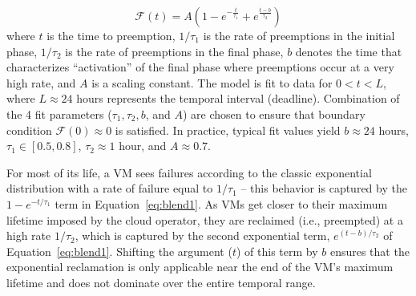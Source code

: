 \vspace*{\subsecspace}
\begin{equation}
  \label{eq:blend1}
  \boxed{
  \mathscr{F}\left(t\right) = A\left(1-e^{-\frac{t}{\tau_1}} + e^{\frac{t-b}{\tau_2}}\right)}
  \end{equation}
\noindent where $t$ is the time to preemption, $1/\tau_1$ is the rate of preemptions in the initial phase, $1/\tau_2$ is the rate of preemptions in the final phase, $b$ denotes the time that characterizes ``activation'' of the final phase where preemptions occur at a very high rate, and $A$ is a scaling constant. 
%
The model is fit to data for $0 < t < L$, where $L \approx 24$ hours represents the temporal interval (deadline).
Combination of the 4 fit parameters ($\tau_1, \tau_2, b$, and $A$) are chosen to ensure that boundary condition $\mathscr{F}(0) \approx 0$ is satisfied.
In practice, typical fit values yield $b \approx 24$ hours, $\tau_1 \in [0.5, 0.8] $, $\tau_2 \approx 1$ hour, and $A \approx 0.7$.






For most of its life, a VM sees failures according to the classic exponential distribution with a rate of failure equal to $1/\tau_1$ -- this behavior is captured by the $1-e^{-t/\tau_1}$ term in Equation~\ref{eq:blend1}. 
As VMs get closer to their maximum lifetime imposed by the cloud operator, they are reclaimed (i.e., preempted) at a high rate $1/\tau_2$, which is captured by the second exponential term, $e^{(t-b)/\tau_2}$ of Equation~\ref{eq:blend1}. 
Shifting the argument ($t$) of this term by $b$ ensures that the exponential reclamation is only applicable near the end of the VM's maximum lifetime and does not dominate over the entire temporal range. 

